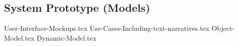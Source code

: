 \subsection{System Prototype (Models)}
{User-Interface-Mockups.tex}
{Use-Cases-Including-text-narratives.tex}
{Object-Model.tex}
{Dynamic-Model.tex}
